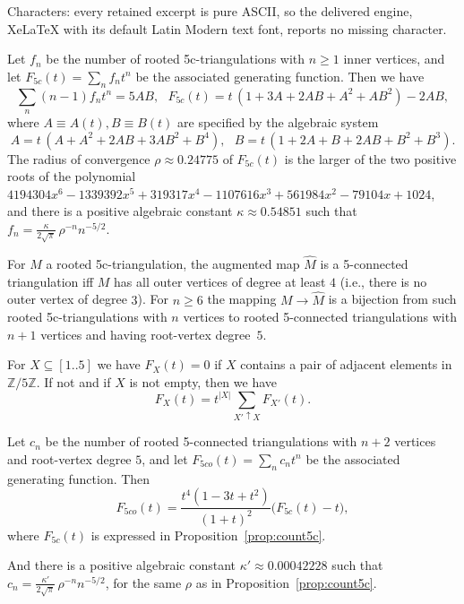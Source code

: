 \documentclass[10pt,a4paper]{amsart}
\def\Ffc{F_{5c}}
\def\Ffco{F_{5co}}
\begin{document}
Characters: every retained excerpt is pure ASCII, so the delivered engine, XeLaTeX with its default Latin Modern text font, reports no missing character.
\begin{prop}\label{prop:count5c}
Let $f_n$ be the number of rooted 5c-triangulations with $n\geq 1$ inner vertices, and let $\Ffc(t)=\sum_nf_nt^n$ be the associated generating function. Then we have
\[
\sum_n (n-1)f_nt^n=5AB,\ \ \ \Ffc(t)=t\,(1+3A+2AB+A^2+AB^2)-2AB,
\]
where $A\equiv A(t),B\equiv B(t)$ are specified by the algebraic system
\begin{equation}\label{eq:AB}
A=t\,(A+A^2+2AB+3AB^2+B^4),\ \ \ B=t\,(1+2A+B+2AB+B^2+B^3).
\end{equation}
The radius of convergence $\rho\approx 0.24775$ of $\Ffc(t)$ is the larger of the two positive roots of the polynomial $4194304x^6 - 1339392x^5 + 319317x^4 - 1107616x^3 + 561984x^2 - 79104x + 1024$, and there is a positive algebraic constant $\kappa\approx 0.54851$
 such that $f_n= \frac{\kappa}{2\sqrt{\pi}}\,\rho^{-n}n^{-5/2}$. 
\end{prop}

\begin{lemma}\label{lem:5co}
For $M$ a rooted 5c-triangulation, the augmented map $\hat{M}$ is a 5-connected triangulation iff $M$ has all outer vertices of degree at least $4$ (i.e., there is no outer vertex of degree $3$). For $n\geq 6$ the mapping $M\to\hat{M}$ is a bijection from such rooted 5c-triangulations with $n$ vertices to rooted 5-connected triangulations with $n+1$ vertices and having root-vertex degree~$5$. 
\end{lemma} 

\begin{lemma}\label{lem:FX}
For $X\subseteq[1..5]$ we have $F_X(t)=0$ if $X$ contains a pair of adjacent elements in $\mathbb{Z}/5\mathbb{Z}$. If not and if $X$ is not empty, then we have
\begin{equation}\label{eq:FX}
F_X(t)=t^{|X|}\sum_{X'\uparrow X}F_{X'}(t).
\end{equation}
\end{lemma}  

\begin{prop}\label{prop:count_5co}
Let $c_n$ be the number of rooted 5-connected triangulations with $n+2$ vertices and root-vertex degree $5$, and let $\Ffco(t)=\sum_nc_nt^n$ be the associated generating function. Then 
\[
\Ffco(t)=\frac{t^4(1-3t+t^2)}{(1+t)^2}\big(\Ffc(t)-t\big),
\]
where $\Ffc(t)$ is expressed in Proposition~\ref{prop:count5c}.

And there is a positive algebraic constant $\kappa'\approx 0.00042228$
 such that $c_n= \frac{\kappa'}{2\sqrt{\pi}}\,\rho^{-n}n^{-5/2}$, for the same $\rho$ as in Proposition~\ref{prop:count5c}. 
\end{prop}
\end{document}
